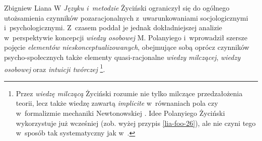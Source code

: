 \begin{artplenv}{Zbigniew Liana}
W \textit{Języku i~metodzie} Życiński ograniczył się do ogólnego utożsamienia czynników pozaracjonalnych z~uwarunkowaniami
socjologicznymi i~psychologicznymi. Z~czasem poddał je jednak dokładniejszej analizie w~perspektywie koncepcji
\textit{wiedzy osobowej} M. Pola\-nyiego %
i~wprowadził szersze pojęcie \textit{elementów nieskonceptualizowanych}, obejmujące
sobą oprócz czynników psycho-społecznych także elementy quasi-racjonalne \textit{wiedzy milczącej}, \textit{wiedzy osobowej}
oraz \textit{intuicji twórczej}
\parencite[zob.][s.~179–191]{zycinski_elementy_1996}\footnote{\label{lia-foo-55}Przez
\textit{wiedzę milczącą} Życiński rozumie nie tylko milczące przedzałożenia teorii, lecz także wiedzę zawartą
\textit{implicite} w~równaniach pola czy w~formalizmie mechaniki Newtonowskiej
\parencite[zob.][s.~189]{zycinski_elementy_1996}.
Idee Polanyiego Życiński wykorzystuje już wcześniej (zob. wyżej przypis \ref{lia-foo-26}), ale nie czyni
tego w~sposób tak systematyczny jak w~\parencite*{zycinski_elementy_1996}.}.


\end{artplenv}
